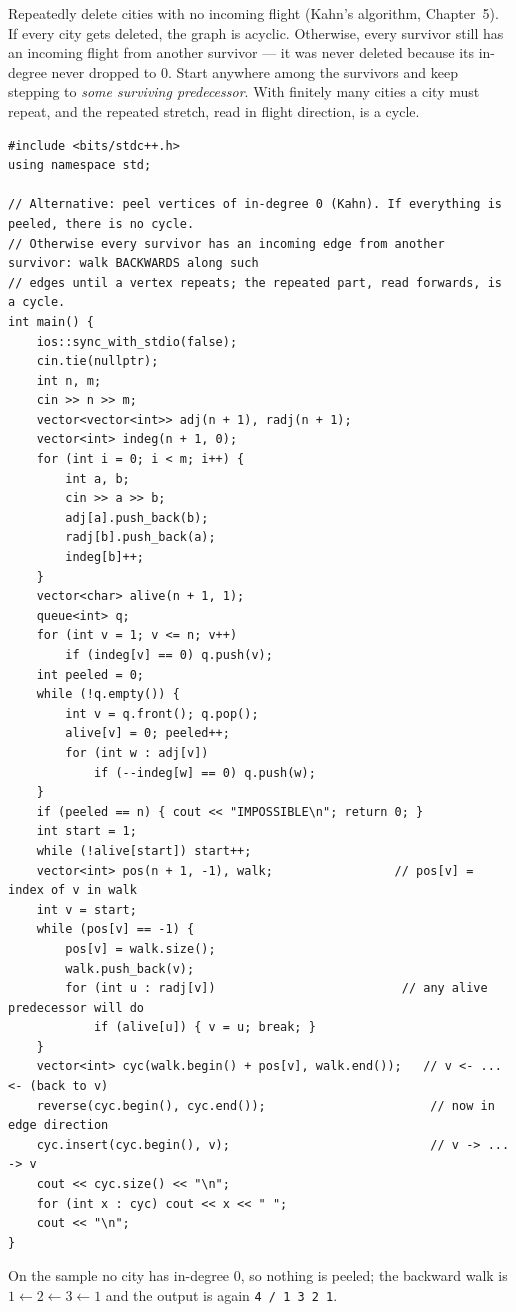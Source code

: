 \begin{alternativebox}
Repeatedly delete cities with no incoming flight (Kahn's algorithm, Chapter~5). If every city gets deleted, the graph is acyclic. Otherwise, every survivor still has an incoming flight from another survivor --- it was never deleted because its in-degree never dropped to 0. Start anywhere among the survivors and keep stepping to \emph{some surviving predecessor}. With finitely many cities a city must repeat, and the repeated stretch, read in flight direction, is a cycle.

\begin{lstlisting}[style=cpp]
#include <bits/stdc++.h>
using namespace std;

// Alternative: peel vertices of in-degree 0 (Kahn). If everything is peeled, there is no cycle.
// Otherwise every survivor has an incoming edge from another survivor: walk BACKWARDS along such
// edges until a vertex repeats; the repeated part, read forwards, is a cycle.
int main() {
    ios::sync_with_stdio(false);
    cin.tie(nullptr);
    int n, m;
    cin >> n >> m;
    vector<vector<int>> adj(n + 1), radj(n + 1);
    vector<int> indeg(n + 1, 0);
    for (int i = 0; i < m; i++) {
        int a, b;
        cin >> a >> b;
        adj[a].push_back(b);
        radj[b].push_back(a);
        indeg[b]++;
    }
    vector<char> alive(n + 1, 1);
    queue<int> q;
    for (int v = 1; v <= n; v++)
        if (indeg[v] == 0) q.push(v);
    int peeled = 0;
    while (!q.empty()) {
        int v = q.front(); q.pop();
        alive[v] = 0; peeled++;
        for (int w : adj[v])
            if (--indeg[w] == 0) q.push(w);
    }
    if (peeled == n) { cout << "IMPOSSIBLE\n"; return 0; }
    int start = 1;
    while (!alive[start]) start++;
    vector<int> pos(n + 1, -1), walk;                 // pos[v] = index of v in walk
    int v = start;
    while (pos[v] == -1) {
        pos[v] = walk.size();
        walk.push_back(v);
        for (int u : radj[v])                          // any alive predecessor will do
            if (alive[u]) { v = u; break; }
    }
    vector<int> cyc(walk.begin() + pos[v], walk.end());   // v <- ... <- (back to v)
    reverse(cyc.begin(), cyc.end());                       // now in edge direction
    cyc.insert(cyc.begin(), v);                            // v -> ... -> v
    cout << cyc.size() << "\n";
    for (int x : cyc) cout << x << " ";
    cout << "\n";
}
\end{lstlisting}
On the sample no city has in-degree 0, so nothing is peeled; the backward walk is $1 \leftarrow 2 \leftarrow 3 \leftarrow 1$ and the output is again \texttt{4 / 1 3 2 1}.
\end{alternativebox}

